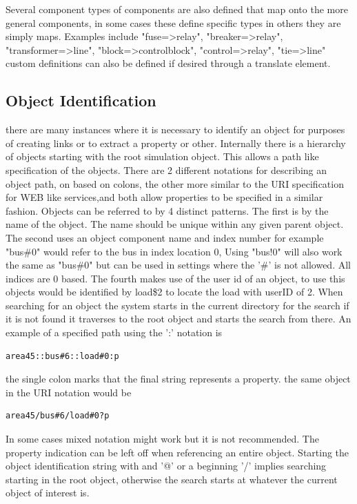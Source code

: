 \documentclass[12pt]{article} %
\begin{document}
Several component types of components are also defined that map onto the more general components,  in some cases these define specific types in others they are simply maps.  Examples include "fuse=>relay", "breaker=>relay",  "transformer=>line",  "block=>controlblock", "control=>relay",  "tie=>line"
custom definitions can also be defined if desired through a translate element.  

\subsection{Object Identification}
there are many instances where it is necessary to identify an object for purposes of creating links or to extract a property or other.  Internally there is a hierarchy of objects starting with the root simulation object.  This allows a path like specification of the objects.  There are 2 different notations for describing an object path, on based on colons, the other more similar to the URI specification for WEB like services,and both allow properties to be specified in a similar fashion.  Objects can be referred to by 4 distinct patterns.  The first is by the name of the object.  The name should be unique within any given parent object.  The second uses an object component name and index number for example "bus\#0"  would refer to the bus in index location 0,  Using "bus!0" will also work the same as "bus\#0" but can be used in settings where the '\#' is not allowed.   All indices are 0 based.  The fourth makes use of the user id of an object, to use this objects would be identified by load\$2 to locate the load with userID of 2.  When searching for an object the system starts in the current directory for the search if it is not found it traverses to the root object and starts the search from there.   
An example of a specified path using the ':' notation is 
\begin{verbatim}
area45::bus#6::load#0:p
\end{verbatim}
the single colon marks that the final string represents a property.  
the same object in the URI notation would be 
\begin{verbatim}
area45/bus#6/load#0?p  
\end{verbatim}
In some cases mixed notation might work but it is not recommended.  The property indication can be left off when referencing an entire object.  Starting the object identification string with and '@' or a beginning '/' implies searching starting in the root object, otherwise the search starts at whatever the current object of interest is.   
\end{document}
